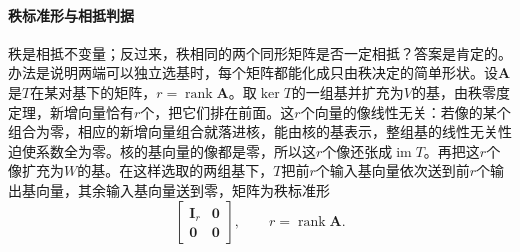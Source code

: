 \paragraph{秩标准形与相抵判据}
\label{sec:ls-equivalence-conditions}
秩是相抵不变量；反过来，秩相同的两个同形矩阵是否一定相抵？答案是肯定的。办法是说明两端可以独立选基时，每个矩阵都能化成只由秩决定的简单形状。设$\bm A$是$T$在某对基下的矩阵，$r=\operatorname{rank}\bm A$。取$\ker T$的一组基并扩充为$V$的基，由秩零度定理，新增向量恰有$r$个，把它们排在前面。这$r$个向量的像线性无关：若像的某个组合为零，相应的新增向量组合就落进核，能由核的基表示，整组基的线性无关性迫使系数全为零。核的基向量的像都是零，所以这$r$个像还张成$\operatorname{im}T$。再把这$r$个像扩充为$W$的基。在这样选取的两组基下，$T$把前$r$个输入基向量依次送到前$r$个输出基向量，其余输入基向量送到零，矩阵为秩标准形
\begin{equation}
 \begin{bmatrix}\bm I_r&\bm0\\\bm0&\bm0\end{bmatrix},
 \qquad r=\operatorname{rank}\bm A.
 \label{eq:ls-rank-normal-form}
\end{equation}


